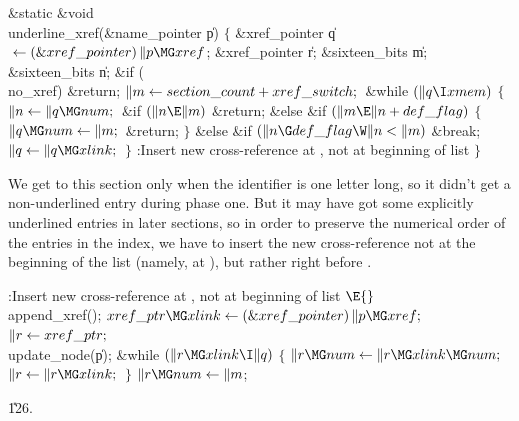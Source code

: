 \Y\B\1\1\&{static} \&{void} \\{underline\_xref}(\&{name\_pointer} \|p)\2\2\6
${}\{{}$\1\6
\&{xref\_pointer} \|q${}\K(\&{xref\_pointer})\,\|p\MG\\{xref}{}$;\6
\&{xref\_pointer} \|r;\6
\&{sixteen\_bits} \|m;\6
\&{sixteen\_bits} \|n;\7
\&{if} (\\{no\_xref})\1\5
\&{return};\2\6
${}\|m\leftarrow\\{section\_count}+\\{xref\_switch};{}$\6
\&{while} ${}(\|q\I\\{xmem}){}$\5
${}\{{}$\1\6
${}\|n\K\|q\MG\\{num};{}$\6
\&{if} ${}(\|n\E\|m){}$\1\5
\&{return};\2\6
\&{else} \&{if} ${}(\|m\E\|n+\\{def\_flag}){}$\5
${}\{{}$\1\6
${}\|q\MG\\{num}\K\|m;{}$\6
\&{return};\6
\4${}\}{}$\2\6
\&{else} \&{if} ${}(\|n\G\\{def\_flag}\W\|n<\|m){}$\1\5
\&{break};\2\6
${}\|q\K\|q\MG\\{xlink};{}$\6
\4${}\}{}$\2\6
:Insert new cross-reference at , not at beginning of list\X\6
\4${}\}{}$\2\par
\fi

We get to this section only when the identifier is one letter long,
so it didn't get a non-underlined entry during phase one.  But it may
have got some explicitly underlined entries in later sections, so in order
to preserve the numerical order of the entries in the index, we have
to insert the new cross-reference not at the beginning of the list
(namely, at ), but rather right before .

\Y\B\4:Insert new cross-reference at , not at beginning of list%
\X${}\E{}$\6
\\{append\_xref}();\6
${}\\{xref\_ptr}\MG\\{xlink}\K(\&{xref\_pointer})\,\|p\MG\\{xref};{}$\6
${}\|r\leftarrow\\{xref\_ptr};{}$\6
\\{update\_node}(\|p);\6
\&{while} ${}(\|r\MG\\{xlink}\I\|q){}$\5
${}\{{}$\1\6
${}\|r\MG\\{num}\K\|r\MG\\{xlink}\MG\\{num};{}$\6
${}\|r\K\|r\MG\\{xlink};{}$\6
\4${}\}{}$\2\6
${}\|r\MG\\{num}\K\|m{}$;%
\par
\U126.\fi

